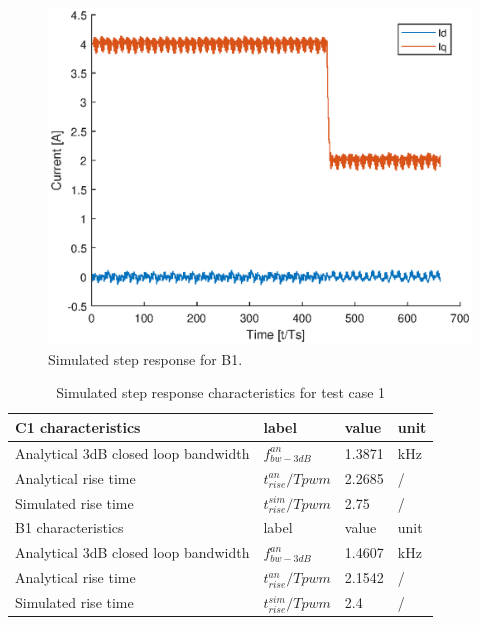 \documentclass[journal]{IEEEtran}
\begin{document}
\begin{figure}[t!]
    \centerline{\includegraphics[width=0.95\linewidth]{figures/B1_step.eps}}
    \caption{Simulated step response for B1.}
    \label{fig:B1_step} 
\end{figure}

\begin{table}[h!]
			  \caption{Simulated step response characteristics for test case 1}
              \label{tab:C1_step}
              \centering
              \begin{tabular}{llll}
                           \midrule\midrule
        C1 characteristics & label & value   & unit\\
        \midrule               
                  Analytical 3dB closed loop bandwidth	& $f_{bw-3dB}^{an}$ & 1.3871 &kHz\\  
                  Analytical rise time  & $t_{rise}^{an}/T{pwm}$ & 2.2685 & /   \\
                  Simulated rise time  & $t_{rise}^{sim}/T{pwm}$ & 2.75 & /   \\
                  \midrule\midrule
        B1 characteristics & label           & value    & unit\\
                  \midrule
                  Analytical 3dB closed loop bandwidth	& $f_{bw-3dB}^{an}$ & 1.4607 &kHz\\  
                  Analytical rise time  & $t_{rise}^{an}/T{pwm}$ & 2.1542 & /   \\
                  Simulated rise time  & $t_{rise}^{sim}/T{pwm}$ & 2.4 & /   \\
                  \midrule\midrule
                                                        
              \end{tabular}
\end{table}
\end{document}
